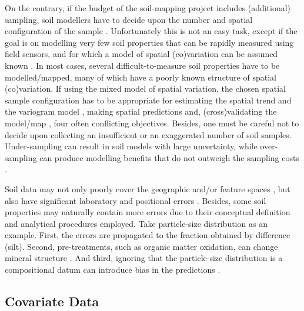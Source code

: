 On the contrary, if the budget of the soil-mapping project includes (additional) sampling, soil
modellers have to decide upon the number and spatial configuration of the sample
\cite{deGruijterEtAl2006, WebsterEtAl2013}. Unfortunately this is not an easy task, except if the
goal is on modelling very few soil properties that can be rapidly measured using field
sensors, and for which a model of spatial (co)variation can be assumed known \cite{MarchantEtAl2006}.
In most cases, several difficult-to-measure soil properties have to be modelled/mapped, many of
which have a poorly known structure of spatial (co)variation. If using the mixed model of spatial
variation, the chosen spatial sample configuration has to be appropriate for estimating the spatial
trend \cite{HenglEtAl2003a, MinasnyEtAl2006b} and the variogram model
\cite{WarrickEtAl1987, WebsterEtAl1992, Lark2002}, making spatial predictions
\cite{YfantisEtAl1987, WalvoortEtAl2010} and, (cross)validating the model/map \cite{BrusEtAl2011}, four
often conflicting objectives. Besides, one must be careful not to decide upon collecting an insufficient
 or an exaggerated number of soil samples. Under-sampling can result in soil models with large 
uncertainty, while over-sampling can produce modelling benefits that do not outweigh the sampling costs 
\cite{vanGroenigenEtAl1999}.

Soil data may not only poorly cover the geographic and/or feature spaces \cite{HenglEtAl2003a}, but
also have significant laboratory and positional errors \cite{NelsonEtAl2011}. Besides, some soil
properties may naturally contain more errors due to their conceptual definition and analytical
procedures employed. Take particle-size distribution as an example. First, the errors are propagated
to the fraction obtained by difference (silt). Second, pre-treatments, such as organic matter
oxidation, can change mineral structure \cite{MikuttaEtAl2005a}. And third, ignoring that the
particle-size distribution is a compositional datum can introduce bias in the predictions
\cite{LarkEtAl2007}.

\subsection{Covariate Data}

